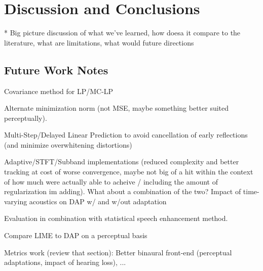 \chapter{Discussion and Conclusions}

* Big picture discussion of what we've learned, how doesa it compare to the literature, what are limitations, what would future directions

\section{Future Work Notes}

Covariance method for LP/MC-LP

Alternate minimization norm (not MSE, maybe something better suited perceptually).

Multi-Step/Delayed Linear Prediction to avoid cancellation of early reflections (and minimize overwhitening distortions)

Adaptive/STFT/Subband implementations (reduced complexity and better tracking at cost of worse convergence, maybe not big of a hit within the context of how much were actually able to acheive / including the amount of regularization im adding). What about a combination of the two? Impact of time-varying acoustics on DAP w/ and w/out adaptation

Evaluation in combination with statistical speech enhancement method.

Compare LIME to DAP on a perceptual basis

Metrics work (review that section): Better binaural front-end (perceptual adaptations, impact of hearing loss), ...


